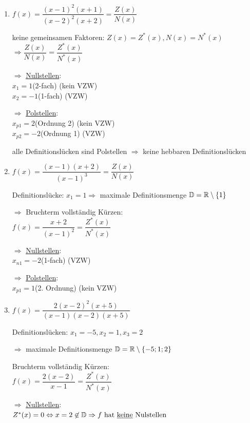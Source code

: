 \Bsp
\begin{enumerate}
	\item $f(x) = \dfrac{(x-1)^2(x+1)}{(x-2)^2(x+2)}=\dfrac{Z(x)}{N(x)}$
	
	keine gemeinsamen Faktoren: $Z(x) = Z^*(x), N(x) = N^*(x)$\\
	$\Rightarrow \dfrac{Z(x)}{N(x)} = \dfrac{Z^*(x)}{N^*(x)}$
	
	$\Rightarrow$ \ul{Nullstellen}:\\
	$x_1=1$\quad (2-fach) (kein VZW)\\
	$x_2=-1$\quad (1-fach) (VZW)
	
	$\Rightarrow$ \ul{Polstellen}:\\
	$x_{p1}=2$\quad (Ordnung 2) (kein VZW)\\
	$x_{p2}=-2$\quad (Ordnung 1) (VZW)
	
	alle Definitionslücken sind Polstellen $\Rightarrow$ keine hebbaren Definitionslücken
	
	\clearpage
	\item $f(x)=\dfrac{(x-1)(x+2)}{(x-1)^3}=\dfrac{Z(x)}{N(x)}$
	
	Definitionslücke: $x_1=1\Rightarrow$ maximale Definitionsmenge $\mathbb{D}=\mathbb{R}\setminus\{1\}$
	
	$\Rightarrow$ Bruchterm vollständig Kürzen:\\
	$f(x)=\dfrac{x+2}{(x-1)^2} = \dfrac{Z^*(x)}{N^*(x)}$
	
	$\Rightarrow$ \ul{Nullstellen}:\\
	$x_{n1} = -2$\quad(1-fach) (VZW)
	
	$\Rightarrow$ \ul{Polstellen}:\\
	$x_{p1} = 1$\quad(2. Ordnung) (kein VZW)
	
	
	\clearpage
	\item $f(x) = \dfrac{2(x-2)^2(x+5)}{(x-1)(x-2)(x+5)}$
	
	Definitionslücken: $x_1=-5,x_2=1,x_3=2$
	
	$\Rightarrow$ maximale Definitionsmenge $\mathbb{D}=\mathbb{R}\setminus\{-5;1;2\}$
	
	Bruchterm vollständig Kürzen:\\
	$f(x)=\dfrac{2(x-2)}{x-1}=\dfrac{Z^*(x)}{N^*(x)}$
	
	$\Rightarrow$ \ul{Nullstellen}:\\
	$Z^*(x)=0\Leftrightarrow x=2 \not\in\mathbb{D}\Rightarrow f\text{ hat \underline{keine} Nulstellen}$
	

\end{enumerate}

